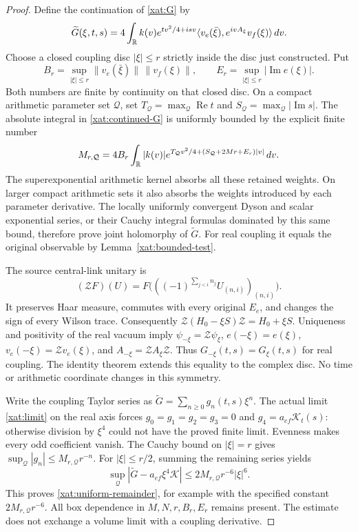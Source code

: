 \begin{proof}
Define the continuation of \eqref{xat:G} by
\begin{equation}
\widetilde G(\xi,t,s)=4\int_\mathbb R k(v)e^{tv^2/4+isv}
 \langle v_e(\bar\xi),e^{ivA_\xi}v_f(\xi)\rangle\,dv.
\label{xat:continued-G}
\end{equation}
Choose a closed coupling disc \(|\xi|\leq r\) strictly inside
the disc just constructed. Put
\[
B_r=\sup_{|\xi|\leq r}
 \|v_e(\bar\xi)\|\,\|v_f(\xi)\|,
\qquad
E_r=\sup_{|\xi|\leq r}|\operatorname{Im}e(\xi)|.
\]
Both numbers are finite by continuity on that closed disc. On a
compact arithmetic parameter set \(\mathcal Q\), set
\(T_{\mathcal Q}=\max_{\mathcal Q}\operatorname{Re}t\) and
\(S_{\mathcal Q}=\max_{\mathcal Q}|\operatorname{Im}s|\).
The absolute integral in \eqref{xat:continued-G} is uniformly
bounded by the explicit finite number
\begin{equation}
M_{r,\mathcal Q}=4B_r\int_\mathbb R |k(v)|
 e^{T_{\mathcal Q}v^2/4+
       (S_{\mathcal Q}+2Mr+E_r)|v|}\,dv.
\label{xat:Cauchy-bound}
\end{equation}
The superexponential arithmetic kernel absorbs all these retained
weights. On larger compact arithmetic sets it also absorbs the
weights introduced by each parameter derivative. The locally
uniformly convergent Dyson and scalar exponential series, or their
Cauchy integral formulas dominated by this same bound, therefore
prove joint holomorphy of \(\widetilde G\). For real coupling it
equals the original observable by
Lemma~\ref{xat:bounded-test}.

The source central-link unitary is
\[
(\mathcal ZF)(U)=
 F\bigl(((-1)^{\sum_{j<i}n_j}U_{(n,i)})_{(n,i)}\bigr).
\]
It preserves Haar measure, commutes with every original \(E_e\),
and changes the sign of every Wilson trace. Consequently
\(\mathcal Z(H_0-\xi S)\mathcal Z=H_0+\xi S\).
Uniqueness and positivity of the real vacuum imply
\(\psi_{-\xi}=\mathcal Z\psi_\xi\),
\(e(-\xi)=e(\xi)\),
\(v_e(-\xi)=\mathcal Z v_e(\xi)\), and
\(A_{-\xi}=\mathcal ZA_\xi\mathcal Z\).
Thus \(G_{-\xi}(t,s)=G_\xi(t,s)\) for real coupling. The identity
theorem extends this equality to the complex disc. No time or
arithmetic coordinate changes in this symmetry.

Write the coupling Taylor series as
\(\widetilde G=\sum_{n\geq0}g_n(t,s)\xi^n\).
The actual limit \eqref{xat:limit} on the real axis forces
\(g_0=g_1=g_2=g_3=0\) and
\(g_4=a_{ef}\mathcal K_t(s)\): otherwise division by \(\xi^4\)
could not have the proved finite limit. Evenness makes every odd
coefficient vanish. The Cauchy bound on \(|\xi|=r\) gives
\(\sup_{\mathcal Q}|g_n|\leq M_{r,\mathcal Q}r^{-n}\).
For \(|\xi|\leq r/2\), summing the remaining series yields
\[
\sup_{\mathcal Q}
 |\widetilde G-a_{ef}\xi^4\mathcal K|
 \leq 2M_{r,\mathcal Q}r^{-6}|\xi|^6.
\]
This proves \eqref{xat:uniform-remainder}, for example with the
specified constant \(2M_{r,\mathcal Q}r^{-6}\). All box dependence
in \(M,N,r,B_r,E_r\) remains present. The estimate does not
exchange a volume limit with a coupling derivative.
\end{proof}

